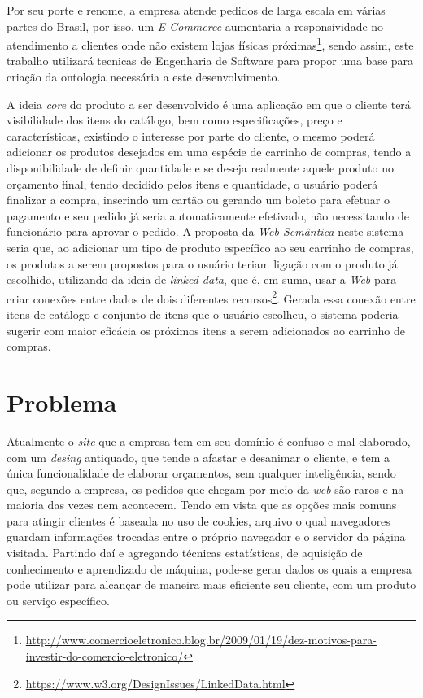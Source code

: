 Por seu porte e renome, a empresa atende pedidos de larga escala em várias partes do Brasil, por isso, um \textit{E-Commerce} aumentaria a responsividade no atendimento a clientes onde não existem lojas físicas próximas\footnote{\url{http://www.comercioeletronico.blog.br/2009/01/19/dez-motivos-para-investir-do-comercio-eletronico/}}, sendo assim, este trabalho utilizará tecnicas de Engenharia de Software para propor uma base para criação da ontologia necessária a este desenvolvimento.

A ideia \textit{core} do produto a ser desenvolvido é uma aplicação em que o cliente terá visibilidade dos itens do catálogo, bem como especificações, preço e características, existindo o interesse por parte do cliente, o mesmo poderá adicionar os produtos desejados em uma espécie de carrinho de compras, tendo a disponibilidade de definir quantidade e se deseja realmente aquele produto no orçamento final, tendo decidido pelos itens e quantidade, o usuário poderá finalizar a compra, inserindo um cartão ou gerando um boleto para efetuar o pagamento e seu pedido já seria automaticamente efetivado, não necessitando de funcionário para aprovar o pedido. A proposta da \textit{Web Semântica} neste sistema seria que, ao adicionar um tipo de produto específico ao seu carrinho de compras, os produtos a serem propostos para o usuário teriam ligação com o produto já escolhido, utilizando da ideia de \textit{linked data}, que é, em suma, usar a \textit{Web} para criar conexões entre dados de dois diferentes recursos\footnote{\url{https://www.w3.org/DesignIssues/LinkedData.html}}. Gerada essa conexão entre itens de catálogo e conjunto de itens que o usuário escolheu, o sistema poderia sugerir com maior eficácia os próximos itens a serem adicionados ao carrinho de compras.

\section{Problema}

Atualmente o \textit{site} que a empresa tem em seu domínio é confuso e mal elaborado, com um \textit{desing} antiquado, que tende a afastar e desanimar o cliente, e tem a única funcionalidade de elaborar orçamentos, sem qualquer inteligência, sendo que, segundo a empresa, os pedidos que chegam por meio da \textit{web} são raros e na maioria das vezes nem acontecem. Tendo em vista que as opções mais comuns para atingir clientes é baseada no uso de cookies, arquivo o qual navegadores guardam informações trocadas entre o próprio navegador e o servidor da página visitada. Partindo daí e agregando técnicas estatísticas, de aquisição de conhecimento e aprendizado de máquina, pode-se gerar dados os quais a empresa pode utilizar para alcançar de maneira mais eficiente seu cliente, com um produto ou serviço específico\cite{boland:2014}.

